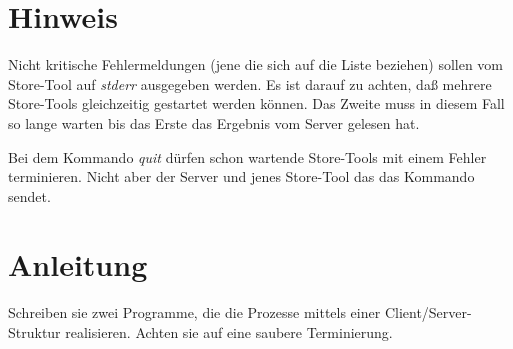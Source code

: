 \section*{Hinweis}
Nicht kritische Fehlermeldungen (jene die sich auf die Liste beziehen) sollen vom Store-Tool auf \emph{stderr} ausgegeben werden. Es ist darauf zu achten, daß mehrere Store-Tools gleichzeitig gestartet werden können. Das Zweite muss in diesem Fall so lange warten bis das Erste das Ergebnis vom Server gelesen hat.

Bei dem Kommando \emph{quit} dürfen schon wartende Store-Tools mit einem Fehler terminieren. Nicht aber der Server und jenes Store-Tool das das Kommando sendet.

\section*{Anleitung}
Schreiben sie zwei Programme, die die Prozesse mittels einer Client/Server-Struktur realisieren. Achten sie auf eine saubere Terminierung.

\osueguidelinesthree


